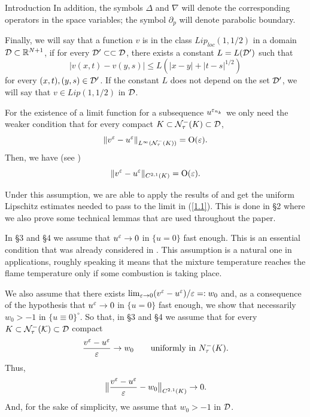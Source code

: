 \begin{section}{Introduction}
In addition, the symbols $\Delta$ and $\nabla$ will denote the corresponding 
operators in the space variables; the symbol $\partial_p$ will denote 
parabolic boundary.

Finally, we will say that a function $v$ is in the class $Lip_{loc}(1,1/2)$ 
in a domain ${\cal D}\subset {\Bbb R}^{N+1}$, if for every ${\cal D}'\subset\subset 
{\cal D}$, there exists a constant $L=L({\cal D}')$ such that
$$|v(x,t) - v(y,s)| \le L (|x-y| + |t-s|^{1/2})$$
for every $(x,t),(y,s)\in {\cal D}'$. If the constant $L$ does not depend on 
the set ${\cal D}'$, we will say that $v\in Lip(1,1/2)$ in ${\cal D}$.

\bigskip

For the existence of a limit function for a subsequence
$u^{\varepsilon_{n_k}}$ we only need the weaker condition
that
for every compact $K\subset {\cal N}_{\tau}^-(K)\subset{\cal D}$, 
\begin{equation}
\label{1.2}
\| v^{\varepsilon} - u^{\varepsilon} \|_{L^{\infty}({\cal N}_{\tau}^-(K))} = \mbox{O}(\varepsilon).
\end{equation}
Then, we have (see \cite{LSU})
\begin{equation}
\label{1.3}
\| v^{\varepsilon} - u^{\varepsilon} \|_{C^{2,1}(K)} = \mbox{O}(\varepsilon).
\end{equation}

Under this assumption, we are able to apply the results of \cite{C} and get 
the uniform Lipschitz estimates needed to pass to the limit in (\ref{1.1}). 
 This is done in \S 2 where
we also prove some technical lemmas that are 
used throughout the paper.

\medskip

In \S 3 and \S 4 we assume that $u^{\varepsilon}\to 0$ in $\{ u=0 \}$ fast enough. 
This is an essential condition that was already considered in \cite{CV}.
This assumption is a natural one in applications, roughly speaking it means 
that the mixture temperature reaches the flame temperature only if some 
combustion is taking place.

 We also assume that
there exists $\lim_{\varepsilon\to0}(v^\varepsilon- u^\varepsilon)/\varepsilon=:w_0$ and, as a consequence
of the hypothesis that $u^\varepsilon\to0$ in $\{u=0\}$ fast enough, we
show that necessarily $w_0>-1$ in $\{u\equiv0\}^\circ$.
So that, in \S 3 and \S 4 we assume that for
every $K\subset \cal N_\tau^-(K)\subset
{\cal D}$ compact
\begin{equation}
\label{ochica}
\frac{ v^{\varepsilon} - u^{\varepsilon}}{\varepsilon}\to w_0 \qquad\mbox{uniformly in }N_\tau^-(K).
\end{equation}
Thus,
\begin{equation}
\label{ochica2}
\big\| \frac{v^{\varepsilon} - u^{\varepsilon}}{\varepsilon}-w_0\big \|_{C^{2,1}(K)} \to 0.
\end{equation}
And, for the sake of simplicity, we  assume that $w_0>-1$ in  ${\cal D}$.


\end{section}
